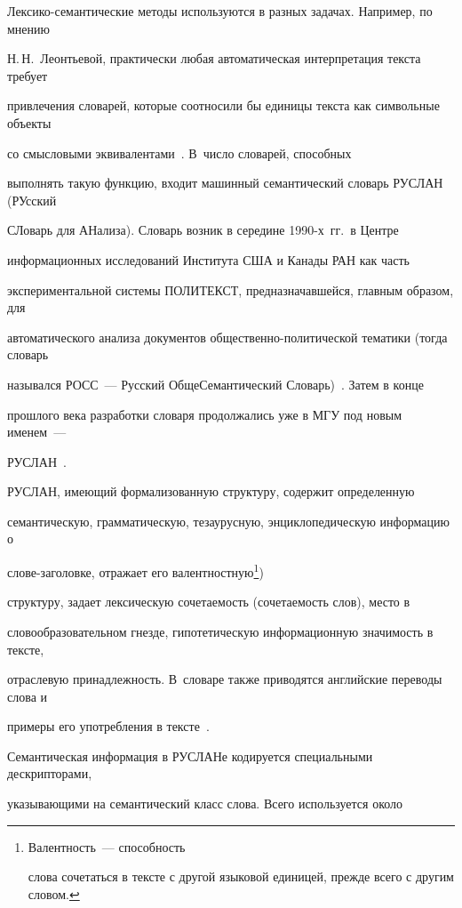    Лексико-семантические методы используются в разных задачах. Например, по мнению 


Н.\,Н.~Леонтьевой, практически любая автоматическая интерпретация текста требует 


привлечения словарей, которые соотносили бы единицы текста как символьные объекты 


со смысловыми эквивалентами~\cite{1-2-11, 2-2-11}. В~число словарей, способных 


выполнять такую функцию, входит машинный семантический словарь РУСЛАН (РУсский 


СЛоварь для АНализа). Словарь возник в середине 1990-х~гг.\  в Центре 


информационных исследований Института США и Канады РАН как часть 


экспериментальной системы ПОЛИТЕКСТ, предназначавшейся, главным образом, для 


автоматического анализа документов общественно-политической тематики (тогда словарь 


назывался РОСС~--- Русский ОбщеСемантический Словарь)~\cite{3-2-11}. Затем в конце 


прошлого века разработки словаря продолжались уже в МГУ под новым именем~--- 


РУСЛАН~\cite{4-2-11}.


   РУСЛАН, имеющий формализованную структуру, содержит определенную 


семантическую, грамматическую, тезаурусную, энциклопедическую информацию о 


слове-заголовке, отражает его валентностную\footnote{{Валентность}~--- способность 


слова сочетаться в тексте с другой языковой единицей, прежде всего с другим словом.}) 


структуру, задает лексическую сочетаемость (сочетаемость слов), место в 


словообразовательном гнезде, гипотетическую информационную значимость в тексте, 


отраслевую принадлежность. В~словаре также приводятся английские переводы слова и 


примеры его употребления в тексте~\cite{4-2-11}.


   


   Семантическая информация в РУСЛАНе кодируется специальными дескрипторами, 


указывающими на семантический класс слова. Всего используется около 



